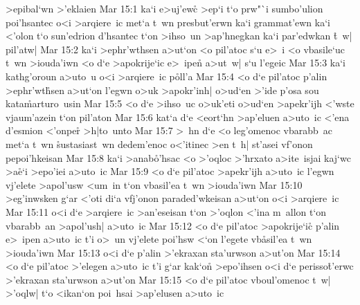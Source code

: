>epibal`wn
>'eklaien\bibvsend
\vs Mar 15:1
ka`i
e>uj'ewc\r{}
>ep`i
t`o
prw"`i
sumbo'ulion
poi'hsantec
o<i
>arqiere~ic
met`a
t~wn
presbut'erwn
ka`i
grammat'ewn
ka`i
<'olon
t`o
sun'edrion
d'hsantec
t`on
>ihso~un
>ap'hnegkan
ka`i
par'edwkan
\r{t}~w|
pil'atw|\bibvsend
\vs Mar 15:2
ka`i
>ephr'wthsen
a>ut`on
<o
pil'atoc
s`u
e>~i
<o
vbasile`uc
t~wn
>iouda'iwn
<o
d`e
>apokrije`ic
e>~ipen\r{}
a>ut~w|
s`u
l'egeic\bibvsend
\vs Mar 15:3
ka`i
kathg'oroun
a>uto~u
o<i
>arqiere~ic
p\r{o}ll'a\bibvsend
{}
\vs Mar 15:4
<o
d`e
pil'atoc
p'alin
>ephr'wt\r{h}sen
a>ut`on
l'egwn
o>uk
>apokr'inh|
o>ud`en
>'ide
p'osa
sou
kata\r{m}arturo~usin\bibvsend
{}
\vs Mar 15:5
<o
d`e
>ihso~uc
o>uk'eti
o>ud`en
>apekr'ijh
<'wste
vjaum'azein
t`on
pil'aton\bibvsend
\vs Mar 15:6
kat`a
d`e
<eort`hn
>ap'eluen
a>uto~ic
<'ena
d'esmion
<'onper\r{}
>h|to~unto\bibvsend
\vs Mar 15:7
>~hn
d`e
<o
leg'omenoc
vbarabb~ac
met`a
t~wn
\r{s}ustasiast~wn
dedem'enoc
o<'itinec
>en
t~h|
st'asei
vf'onon
pepoi'hkeisan\bibvsend
\vs Mar 15:8
ka`i
>anab\r{o}'hsac
<o
>'oqloc
>'hrxato
a>ite~isjai
kaj`wc
>a\r{e}`i
>epo'iei
a>uto~ic\bibvsend
\vs Mar 15:9
<o
d`e
pil'atoc
>apekr'ijh
a>uto~ic
l'egwn
vj'elete
>apol'usw
<um~in
t`on
vbasil'ea
t~wn
>iouda'iwn\bibvsend
\vs Mar 15:10
>eg'inwsken
g`ar
<'oti
di`a
vfj'onon
paraded'wkeisan
a>ut`on
o<i
>arqiere~ic\bibvsend
\vs Mar 15:11
o<i
d`e
>arqiere~ic
>an'eseisan
t`on
>'oqlon
<'ina
m~allon
t`on
vbarabb~an
>apol'ush|
a>uto~ic\bibvsend
\vs Mar 15:12
<o
d`e
pil'atoc
>apokrije`ic\r{}
p'alin
e>~ipen
a>uto~ic
t'i
o>~un
vj'elete
poi'hsw
<`on
l'egete
vb\r{a}sil'ea
t~wn
>iouda'iwn\bibvsend
\vs Mar 15:13
o<i
d`e
p'alin
>'ekraxan
sta'urwson
a>ut'on\bibvsend
\vs Mar 15:14
<o
d`e
pil'atoc
>'elegen
a>uto~ic
t'i
g`ar
kak`on\r{}
>epo'ihsen
o<i
d`e
perisso\r{t}'erwc
>'ekraxan
sta'urwson
a>ut'on\bibvsend
\vs Mar 15:15
<o
d`e
pil'atoc
vboul'omenoc
t~w|
>'oqlw|
t`o
<ikan`on
poi~hsai
>ap'elusen
a>uto~ic
